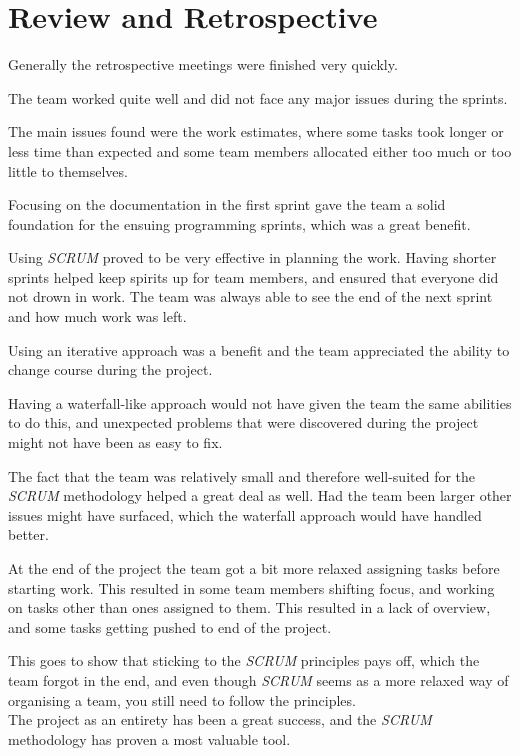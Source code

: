 \section{Review and Retrospective}

Generally the retrospective meetings were finished very quickly.

The team worked quite well and did not face any major issues during the sprints.

The main issues found were the work estimates, where some tasks took longer or less time than expected and some team members allocated either too much or too little to themselves.

Focusing on the documentation in the first sprint gave the team a solid foundation for the ensuing programming sprints, which was a great benefit.

Using \textit{SCRUM} proved to be very effective in planning the work. Having shorter sprints helped keep spirits up for team members, and ensured that everyone did not drown in work. The team was always able to see the end of the next sprint and how much work was left.

Using an iterative approach was a benefit and the team appreciated the ability to change course during the project.

Having a waterfall-like approach would not have given the team the same abilities to do this, and unexpected problems that were discovered during the project might not have been as easy to fix.

The fact that the team was relatively small and therefore well-suited for the \textit{SCRUM} methodology helped a great deal as well. Had the team been larger other issues might have surfaced, which the waterfall approach would have handled better.

At the end of the project the team got a bit more relaxed assigning tasks before starting work. This resulted in some team members shifting focus, and working on tasks other than ones assigned to them. This resulted in a lack of overview, and some tasks getting pushed to end of the project.

This goes to show that sticking to the \textit{SCRUM} principles pays off, which the team forgot in the end, and even though \textit{SCRUM} seems as a more relaxed way of organising a team, you still need to follow the principles.\\

The project as an entirety has been a great success, and the \textit{SCRUM} methodology has proven a most valuable tool.